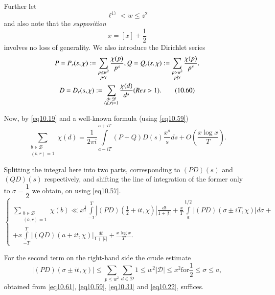 Further let
\begin{equation*}
\ell^{17} < w \leq z^2 \tag{10.58}\label{eq10.58}
\end{equation*}
and also note that the \textit{supposition}
\begin{equation*}
x=[x]+ \frac{1}{2} \tag{10.59}\label{eq10.59}
\end{equation*}
involves no loss of generality. We also introduce the Dirichlet series 
\begin{gather*}
P=P_r (s, \chi ) := \sum_{\substack{p \leq w^2 \\ p \nmid r}}
\frac{\chi (p)}{p^s}, Q=Q_r (s ,\chi ):=\sum_{\substack{p > w^2 \\ p
    \not\mid r}} \frac{\chi (p)}{p^s},\\
 D=D_r (s ,\chi ) :=
\sum_{\substack{d \in \mathscr{D} \\ (d, r)=1}} \frac{\chi (d)}{d^s}
(Re s > 1). \tag{10.60}\label{eq10.60} 
\end{gather*}\pageoriginale

Now, by \eqref{eq10.19} and a well-known formula (using
\eqref{eq10.59}) 
\begin{equation*}
\sum_{\substack{b \in \mathscr{B} \\ (b , r)=1}} \chi (d) = \frac{1}{2 \pi
  i} \int\limits_{a-iT}^{a+iT} (P + Q)D(s) \frac{x^s}{s} ds+ O(\frac{x
  \log x}{T}). \tag{10.61}\label{eq10.61} 
\end{equation*}

Splitting the integral here into two parts, corresponding to $(PD)(s)$
and $(QD)(s)$ respectively, and shifting the line of integration of
the former only to $\sigma = \dfrac{1}{2}$ we obtain, on using
\eqref{eq10.57}. 
{\fontsize{10}{12}\selectfont
\begin{equation*}
\begin{cases}
\sum\limits_{\substack{b \in \mathscr{B} \\ (b,r)=1}} \chi (b) \ll
x^{\frac{1}{2}} \int\limits_{-T}^{T} | (PD)(\frac{1}{2} + it, \chi)|
\frac{dt}{1+|t|} + \frac{x}{T} \int\limits_{a}^{1/2}
|(PD)(\sigma \pm iT, \chi)| d \sigma + \\ +  x
\int\limits_{-T}^{T}|(QD)(a + it , \chi )| \frac{dt}{1+ |t|} + \frac{x
  \log x}{T}.  
\end{cases}\tag{10.62}\label{eq10.62}
\end{equation*}}

For the second term on the right-hand side the crude estimate
\begin{equation*}
|(PD) (\sigma \pm it , \chi )| \leq \sum_{p \leq w^2 } \sum_{d \in
  \mathscr{D}} 1 \leq w^2 |\mathscr{D}| \leq x^2 \text{for}
\frac{1}{2} \leq \sigma \leq a, \tag{10.63}\label{eq10.63} 
\end{equation*}
obtained from \eqref{eq10.61}, \eqref{eq10.59}, \eqref{eq10.31} and
\eqref{eq10.22}, suffices. 

